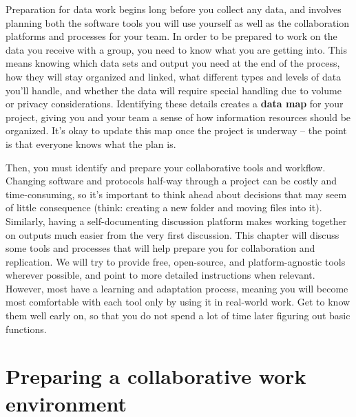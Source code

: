 
\begin{fullwidth}
Preparation for data work begins long before you collect any data,
and involves planning both the software tools you will use yourself
as well as the collaboration platforms and processes for your team.
In order to be prepared to work on the data you receive with a group,
you need to know what you are getting into.
This means knowing which data sets and output you need at the end of the process,
how they will stay organized and linked,
what different types and levels of data you'll handle,
and whether the data will require special handling due to volume or privacy considerations.
Identifying these details creates a \textbf{data map} for your project,
giving you and your team a sense of how information resources should be organized.
It's okay to update this map once the project is underway --
the point is that everyone knows what the plan is.

Then, you must identify and prepare your collaborative tools and workflow.
Changing software and protocols half-way through a project can be costly and time-consuming,
so it's important to think ahead about decisions that may seem of little consequence
(think: creating a new folder and moving files into it).
Similarly, having a self-documenting discussion platform
makes working together on outputs much easier from the very first discussion.
This chapter will discuss some tools and processes that
will help prepare you for collaboration and replication.
We will try to provide free, open-source, and platform-agnostic tools wherever possible,
and point to more detailed instructions when relevant.
However, most have a learning and adaptation process,
meaning you will become most comfortable with each tool
only by using it in real-world work.
Get to know them well early on,
so that you do not spend a lot of time later figuring out basic functions.
\end{fullwidth}


\section{Preparing a collaborative work environment}

